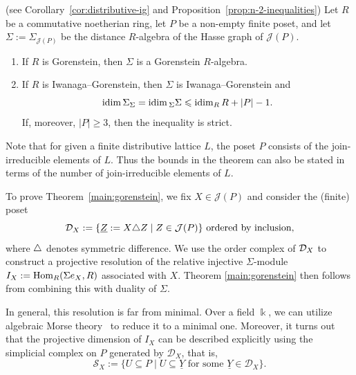 \documentclass[a4paper,leqno]{amsart}
\begin{document}
\begin{main}\label{main:gorenstein}
\textnormal{(see Corollary~\ref{cor:distributive-ig} and Proposition~\ref{prop:n-2-inequalities})}
Let $R$ be a commutative noetherian ring, let $P$ be a non-empty finite poset, and let $\Sigma:=\Sigma_{\mathcal J(P)}$ be the distance $R$-algebra of the Hasse graph of $\mathcal J(P)$.
\begin{enumerate}
\item If $R$ is Gorenstein, then $\Sigma$ is a Gorenstein $R$-algebra.
\item If $R$ is Iwanaga--Gorenstein, then $\Sigma$ is Iwanaga--Gorenstein and
\[
 \operatorname{idim}\Sigma_\Sigma=\operatorname{idim}{}_\Sigma\Sigma
 \leqslant\operatorname{idim}_RR+|P|-1.
\]
If, moreover, $|P|\ge 3$, then the inequality is strict.
\end{enumerate}
\end{main}
Note that for given a finite distributive lattice $L$, the poset $P$ consists of the join-irreducible elements of $L$. Thus the bounds in the theorem can also be stated in terms of the number of join-irreducible elements of $L$.

To prove Theorem~\ref{main:gorenstein}, we fix $X\in\mathcal J(P)$ and consider the (finite) poset
\[
 \mathcal D_X:=\{\underline Z:=X{\mathbin{\triangle}} Z\mid Z\in\mathcal J(P)\} \text{ ordered by inclusion,}
\]
where ${\mathbin{\triangle}}$ denotes symmetric difference. 
We use the order complex of $\mathcal D_X$ to construct a projective resolution of the relative injective $\Sigma$-module $I_X:=\operatorname{Hom}_R(\Sigma e_X, R)$ associated with $X$. 
Theorem \ref{main:gorenstein} then follows from combining this with duality of $\Sigma$.

In general, this resolution is far from minimal. 
Over a field $\Bbbk$, we can utilize algebraic Morse theory~\cite{CLZ26} to reduce it to a minimal one.
Moreover, it turns out that the projective dimension of $I_X$ can be described explicitly using the simplicial complex on $P$ generated by $\mathcal D_X$, that is,
\[
 \mathcal S_X:=\{U\subseteq P\mid U\subseteq\underline Y\text{ for some }\underline Y\in\mathcal D_X\}.
\]
\end{document}
